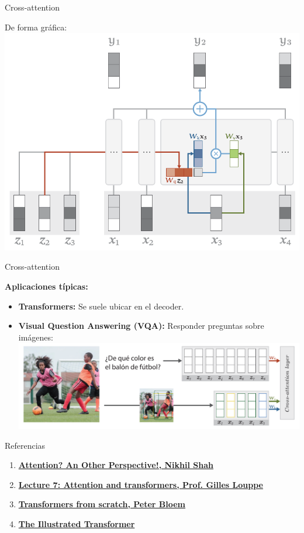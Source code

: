 \documentclass[aspectratio=169]{beamer}
\begin{document}
\begin{frame}{Cross-attention}

  De forma gráfica:\\
  \includegraphics[width=.6\textwidth, center]{imgs/tema4/att/CAT.pdf}

\end{frame}
\begin{frame}{Cross-attention}
  
  \textbf{Aplicaciones típicas:}
  \begin{itemize}
    \item \textbf{Transformers:} Se suele ubicar en el decoder.  
    \item \textbf{Visual Question Answering (VQA):} Responder preguntas sobre imágenes:\\
    \vspace{.5cm}
    \includegraphics[width=.9\textwidth, center]{imgs/tema4/att/CAT_sample.pdf}
  \end{itemize}

\end{frame}

\begin{frame}[t]{Referencias}
  \begin{enumerate}
    \item \href{https://learningturtle.github.io/Blog/posts/attention_another_perspective_part2/}{\textbf{Attention? An Other Perspective!, Nikhil Shah}}\\
    \item \href{https://glouppe.github.io/info8010-deep-learning/?p=lecture7.md}{\textbf{Lecture 7: Attention and transformers, Prof. Gilles Louppe}}\\  
    \item \href{https://peterbloem.nl/blog/transformers}{\textbf{Transformers from scratch, Peter Bloem}}
    \item \href{https://jalammar.github.io/illustrated-transformer/}{\textbf{The Illustrated Transformer}} \\
  \end{enumerate}
\end{frame}
\end{document}
